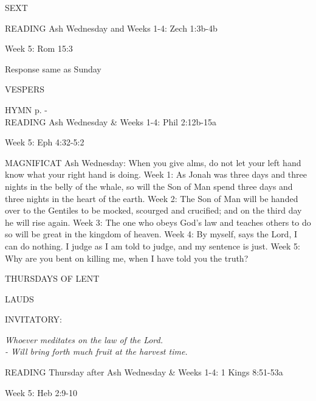 \begin{flushleft}\normalsize{\uppercase{SEXT\\}}\end{flushleft}
READING
Ash Wednesday and Weeks 1-4:    Zech 1:3b-4b    

Week 5:    Rom 15:3    

Response same as Sunday

\begin{flushleft}\normalsize{\uppercase{VESPERS\\}}\end{flushleft}
\small{\uppercase{HYMN} p. \pageref{lent:firstHymn}-\pageref{lent:lastHymn}\\}
READING
Ash Wednesday \& Weeks 1-4:    Phil 2:12b-15a

Week 5:    Eph 4:32-5:2    

MAGNIFICAT
Ash Wednesday:	When you give alms, do not let your left hand know what your right hand is doing.
Week 1:	As Jonah was three days and three nights in the belly of the whale, so will the Son of Man spend three days and three nights in the heart of the earth.
Week 2:	The Son of Man will be handed over to the Gentiles to be mocked, scourged and crucified; and on the third day he will rise again.
Week 3:	The one who obeys God's law and teaches others to do so will be great in the kingdom of heaven.
Week 4:	By myself, says the Lord, I can do nothing. I judge as I am told to judge, and my sentence is just.
Week 5:	Why are you bent on killing me, when I have told you the truth?

	\begin{center}
\normalsize THURSDAYS OF LENT
	\end{center}

\begin{flushleft}\normalsize{\uppercase{LAUDS\\}}\end{flushleft}
\small{\uppercase{INVITATORY:}}\normalsize
\begin{center}
\textit{Whoever meditates on the law of the Lord.\\}
\textit{- Will bring forth much fruit at the harvest time.\\}
\end{center}
READING
Thursday after Ash Wednesday \& Weeks 1-4:    1 Kings 8:51-53a    

Week 5:    Heb 2:9-10    

